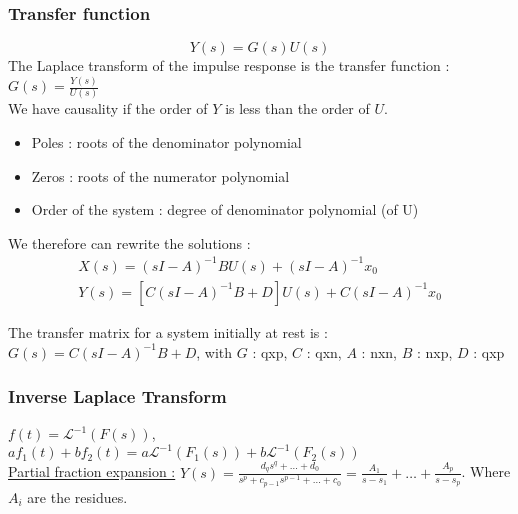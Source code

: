\documentclass[../main.tex]{subfiles}
\begin{document}
\subsubsection{Transfer function}
\begin{equation}
    Y(s) = G(s)U(s)
\end{equation}
The Laplace transform of the impulse response is the transfer function : $G(s) = \frac{Y(s)}{U(s)}$\\
We have causality if the order of $Y$ is less than the order of $U$.\\

\begin{itemize}
    \item Poles : roots of the denominator polynomial\\
    \item Zeros : roots of the numerator polynomial\\
    \item Order of the system : degree of denominator polynomial (of U)\\
\end{itemize}

We therefore can rewrite the solutions : \\
\begin{equation}
    \begin{split}
        X(s) = (sI-A)^{-1} BU(s) + (sI-A)^{-1}x_0\\
        Y(s) = [C(sI-A)^{-1}B+D]U(s) + C(sI-A)^{-1}x_0
    \end{split}
\end{equation}

The transfer matrix for a system initially at rest is : $G(s) = C(sI-A)^{-1}B + D$, with $G$ : qxp, $C$ : qxn, $A$ : nxn, $B$ : nxp, $D$ : qxp\\

\subsubsection{Inverse Laplace Transform}
$f(t) = \mathcal{L}^{-1}(F(s))$, $af_1(t)+bf_2(t) = a\mathcal{L}^{-1}(F_1(s))+b\mathcal{L}^{-1}(F_2(s))$\\

\quad \underline{Partial fraction expansion :} $Y(s) = \frac{d_q s^q + \dots + d_0}{s^p+c_{p-1}s^{p-1}+\dots + c_0} = \frac{A_1}{s-s_1}+\dots + \frac{A_p}{s-s_p}$. Where $A_i$ are the residues.\\
\end{document}
